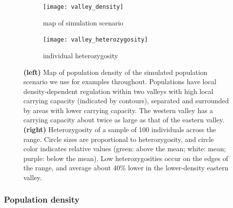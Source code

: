 \documentclass{ar-1col}
\begin{document}
\begin{figure}	%
    \centering
    \begin{subfigure}{0.95\textwidth}
        \centering
        \texttt{[image: valley\_density]}
        \caption{map of simulation scenario}
        \label{valley_map}
    \end{subfigure}
    \begin{subfigure}{0.95\textwidth}
        \centering
        \texttt{[image: valley\_heterozygosity]}
        \caption{individual heterozygosity}
        \label{valley_het}
    \end{subfigure}
        \caption{
            \textbf{(left)} Map of population density of the simulated population scenario
            we use for examples throughout.
            Populations have local density-dependent regulation
            within two valleys with high local carrying capacity (indicated by contours),
            separated and surrounded by areas with lower carrying capacity.
            The western valley has a carrying capacity about twice as large as that of the eastern valley.
            \textbf{(right)} Heterozygosity of a sample of 100 individuals across the range.
            Circle sizes are proportional to heterozygosity,
            and circle color indicates relative values
            (green: above the mean; white: mean; purple: below the mean).
            Low heterozygosities occur on the edges of the range,
            and average about 40\% lower in the lower-density eastern valley.
		}
        \label{pop_density}
\end{figure}



\subsubsection{Population density}
\end{document}
